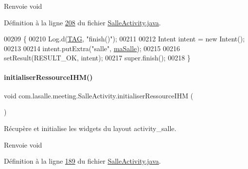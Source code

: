 \begin{DoxyReturn}{Renvoie}
void 
\end{DoxyReturn}


Définition à la ligne \hyperlink{_salle_activity_8java_source_l00208}{208} du fichier \hyperlink{_salle_activity_8java_source}{Salle\+Activity.\+java}.


\begin{DoxyCode}
00209     \{
00210         Log.d(\hyperlink{classcom_1_1lasalle_1_1meeting_1_1_salle_activity_a70adba176c2984edf5ae1b188017ac25}{TAG}, \textcolor{stringliteral}{"finish()"});
00211 
00212         Intent intent = \textcolor{keyword}{new} Intent();
00213 
00214         intent.putExtra(\textcolor{stringliteral}{"salle"}, \hyperlink{classcom_1_1lasalle_1_1meeting_1_1_salle_activity_a7ae6e92ee66fa15d999f166f40738648}{maSalle});
00215 
00216         setResult(RESULT\_OK, intent);
00217         super.finish();
00218     \}
\end{DoxyCode}
\mbox{\label{classcom_1_1lasalle_1_1meeting_1_1_salle_activity_af41d9cf11c5032e1c44b7e8f08b8211a}} 
\paragraph{\texorpdfstring{initialiser\+Ressource\+I\+H\+M()}{initialiserRessourceIHM()}}
{\footnotesize\ttfamily void com.\+lasalle.\+meeting.\+Salle\+Activity.\+initialiser\+Ressource\+I\+HM (\begin{DoxyParamCaption}{ }\end{DoxyParamCaption})}



Récupère et initialise les widgets du layout activity\+\_\+salle. 

\begin{DoxyReturn}{Renvoie}
void 
\end{DoxyReturn}


Définition à la ligne \hyperlink{_salle_activity_8java_source_l00189}{189} du fichier \hyperlink{_salle_activity_8java_source}{Salle\+Activity.\+java}.



